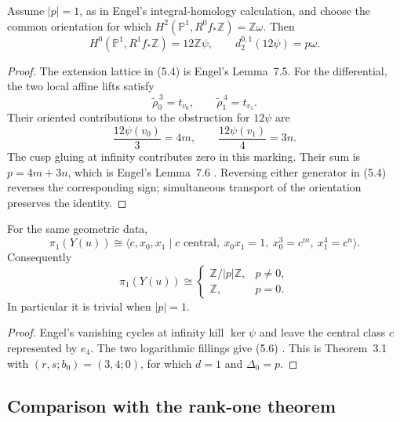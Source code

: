 \documentclass[11pt]{article}
\numberwithin{equation}{section}
\begin{document}
\begin{theorem}
Assume $|p|=1$, as in Engel's integral-homology calculation, and choose the
common orientation for which
$H^2(\mathbb P^1,R^0f_*\mathbb Z)=\mathbb Z\omega$.  Then
\[
 H^0(\mathbb P^1,R^1f_*\mathbb Z)=12\mathbb Z\psi,
 \qquad
                  d_2^{0,1}(12\psi)=p\omega.                      \tag{5.4}
\]
\end{theorem}

\begin{proof}
The extension lattice in (5.4) is Engel's Lemma~7.5.  For the differential,
the two local affine lifts satisfy
\[
                  \widetilde\rho_0^{\,3}=t_{v_0},
                  \qquad \widetilde\rho_1^{\,4}=t_{v_1}.
\]
Their oriented contributions to the obstruction for $12\psi$ are
\[
       \frac{12\psi(v_0)}3=4m,\qquad
       \frac{12\psi(v_1)}4=3n.                                   \tag{5.5}
\]
The cusp gluing at infinity contributes zero in this marking.  Their sum is
$p=4m+3n$, which is Engel's Lemma~7.6
\cite[pp.~20--21]{Engel}.  Reversing either generator in (5.4) reverses the
corresponding sign; simultaneous transport of the orientation preserves the
identity.
\end{proof}

\begin{proposition}
For the same geometric data,
\[
 \pi_1(Y(u))\cong
 \langle c,x_0,x_1\mid c\text{ central},\ x_0x_1=1,
          \ x_0^3=c^m,\ x_1^4=c^n\rangle.                         \tag{5.6}
\]
Consequently
\[
 \pi_1(Y(u))\cong
 \begin{cases}
  \mathbb Z/|p|\mathbb Z,&p\ne0,\\
  \mathbb Z,&p=0.
 \end{cases}                                                       \tag{5.7}
\]
In particular it is trivial when $|p|=1$.
\end{proposition}

\begin{proof}
Engel's vanishing cycles at infinity kill $\ker\psi$ and leave the central
class $c$ represented by $e_4$.  The two logarithmic fillings give (5.6)
\cite[Proposition 6.1, pp.~15--16]{Engel}.  This is Theorem~3.1 with
$(r,s;b_0)=(3,4;0)$, for which $d=1$ and $\Delta_0=p$.
\end{proof}

\subsection*{Comparison with the rank-one theorem}
\end{document}
